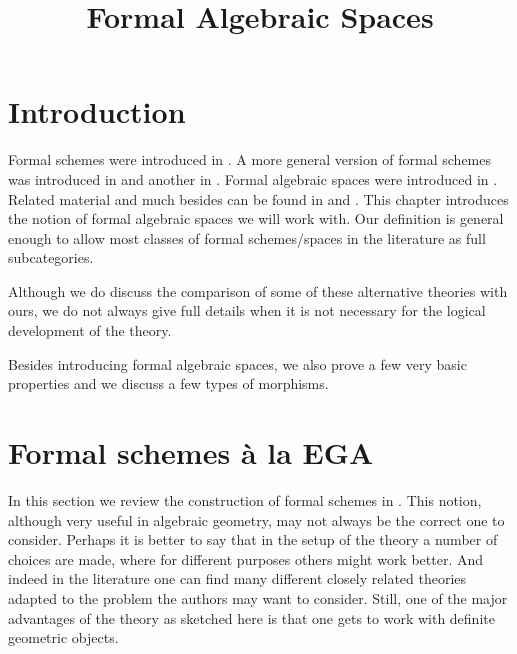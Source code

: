 

%


\title{Formal Algebraic Spaces}


\maketitle

\label{section-phantom}

\tableofcontents

\section{Introduction}
\label{section-introduction}

\noindent
Formal schemes were introduced in \cite{EGA}. A more general version
of formal schemes was introduced in \cite{McQuillan} and another
in \cite{Yasuda}. Formal algebraic spaces were introduced in \cite{Kn}.
Related material and much besides can be found in
\cite{Abbes} and \cite{Fujiwara-Kato}.
This chapter introduces the notion of formal algebraic spaces
we will work with. Our definition is general enough to allow most
classes of formal schemes/spaces in the literature as full subcategories.

\medskip\noindent
Although we do discuss the comparison of some of these alternative theories
with ours, we do not always give full details when it is not necessary for
the logical development of the theory.

\medskip\noindent
Besides introducing formal algebraic spaces, we also prove a few very
basic properties and we discuss a few types of morphisms.










\section{Formal schemes \`a la EGA}
\label{section-formal-schemes-EGA}

\noindent
In this section we review the construction of formal schemes in \cite{EGA}.
This notion, although very useful in algebraic geometry,
may not always be the correct one to consider. Perhaps it is better to say
that in the setup of the theory a number of choices are made, where for
different purposes others might work better. And indeed in the literature
one can find many different closely related theories
adapted to the problem the authors may want to consider. Still, one
of the major advantages of the theory as sketched here is that one
gets to work with definite geometric objects.

